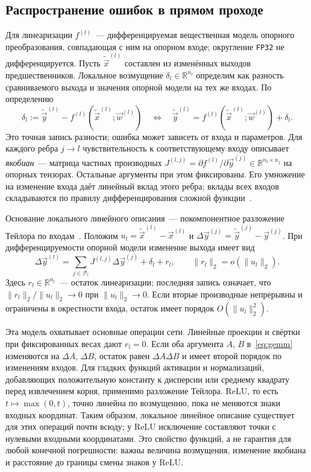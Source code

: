 \subsection{Распространение ошибок в прямом проходе}

Для линеаризации $f^{(l)}$~--- дифференцируемая вещественная модель
опорного преобразования, совпадающая с ним на опорном входе;
округление \texttt{FP32} не дифференцируется.
Пусть $\widetilde{\Vec{x}}^{(l)}$ составлен из изменённых выходов
предшественников. Локальное возмущение $\delta_l\in\mathbb{R}^{n_l}$
определим как разность сравниваемого выхода и значения опорной модели
на тех же входах. По определению
\[
    \delta_l:=\widetilde{\Vec{y}}^{(l)}
        -f^{(l)}(\widetilde{\Vec{x}}^{(l)};\Vec{w}^{(l)})
    \quad\Longleftrightarrow\quad
    \widetilde{\Vec{y}}^{(l)}
        =f^{(l)}(\widetilde{\Vec{x}}^{(l)};\Vec{w}^{(l)})+\delta_l.
\]
Это точная запись разности; ошибка может зависеть от входа и параметров.
Для каждого ребра $j\to l$ чувствительность к соответствующему входу
описывает \emph{якобиан}~--- матрица частных производных
$J^{(l,j)}=\partial f^{(l)}/\partial\Vec{y}^{(j)}
\in\mathbb{R}^{n_l\times n_j}$ на опорных тензорах.
Остальные аргументы при этом фиксированы.
Его умножение на изменение входа даёт линейный вклад этого ребра;
вклады всех входов складываются по правилу дифференцирования
сложной функции~\cite[разд.~2]{Petersen2012}.

Основание локального линейного описания~--- покомпонентное разложение
Тейлора по входам~\cite[разд.~10.1.2]{Petersen2012}.
Положим $u_l=\widetilde{\Vec{x}}^{(l)}-\Vec{x}^{(l)}$ и
$\Delta\Vec{y}^{(j)}=\widetilde{\Vec{y}}^{(j)}-\Vec{y}^{(j)}$.
При дифференцируемости опорной модели изменение выхода имеет вид
\[
    \Delta\Vec{y}^{(l)}
    =\sum_{j\in\mathcal{P}_l}J^{(l,j)}\Delta\Vec{y}^{(j)}
       +\delta_l+r_l,\qquad
    \|r_l\|_2=o(\|u_l\|_2).
\]
Здесь $r_l\in\mathbb{R}^{n_l}$~--- остаток линеаризации;
последняя запись означает, что $\|r_l\|_2/\|u_l\|_2\to0$
при $\|u_l\|_2\to0$. Если вторые производные непрерывны и ограничены
в окрестности входа, остаток имеет порядок $O(\|u_l\|_2^2)$.

Эта модель охватывает основные операции сети.
Линейные проекции и свёртки при фиксированных весах дают $r_l=0$.
Если оба аргумента $A$, $B$ в~\eqref{eq:gemm} изменяются
на $\Delta A$, $\Delta B$, остаток равен $\Delta A\Delta B$
и имеет второй порядок по изменениям входов.
Для гладких функций активации и нормализаций, добавляющих положительную
константу к дисперсии или среднему квадрату перед извлечением корня,
применимо разложение Тейлора.
ReLU, то есть $t\mapsto\max(0,t)$, точно линейна по возмущению,
пока не меняются знаки входных координат.
Таким образом, локальное линейное описание существует для этих операций
почти всюду; у ReLU исключение составляют точки
с нулевыми входными координатами.
Это свойство функций, а не гарантия для любой конечной погрешности:
важны величина возмущения, изменение якобиана и расстояние
до границы смены знаков у ReLU.

